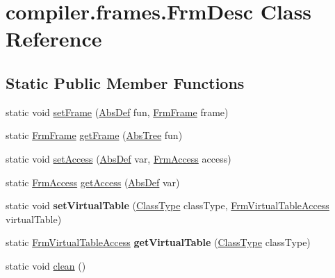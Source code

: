 \hypertarget{classcompiler_1_1frames_1_1_frm_desc}{}\section{compiler.\+frames.\+Frm\+Desc Class Reference}
\label{classcompiler_1_1frames_1_1_frm_desc}
\subsection*{Static Public Member Functions}
\begin{DoxyCompactItemize}
\item 
static void \hyperlink{classcompiler_1_1frames_1_1_frm_desc_a28716d1f65fe0570d4bd8f10bc5368e7}{set\+Frame} (\hyperlink{classcompiler_1_1abstr_1_1tree_1_1def_1_1_abs_def}{Abs\+Def} fun, \hyperlink{classcompiler_1_1frames_1_1_frm_frame}{Frm\+Frame} frame)
\item 
static \hyperlink{classcompiler_1_1frames_1_1_frm_frame}{Frm\+Frame} \hyperlink{classcompiler_1_1frames_1_1_frm_desc_a01656952662f7132eecf87da7fd7f2ec}{get\+Frame} (\hyperlink{classcompiler_1_1abstr_1_1tree_1_1_abs_tree}{Abs\+Tree} fun)
\item 
static void \hyperlink{classcompiler_1_1frames_1_1_frm_desc_a2c1d68dbff5ca39ab5ffaf4b098a2875}{set\+Access} (\hyperlink{classcompiler_1_1abstr_1_1tree_1_1def_1_1_abs_def}{Abs\+Def} var, \hyperlink{interfacecompiler_1_1frames_1_1_frm_access}{Frm\+Access} access)
\item 
static \hyperlink{interfacecompiler_1_1frames_1_1_frm_access}{Frm\+Access} \hyperlink{classcompiler_1_1frames_1_1_frm_desc_a609f7edf099f5347df87b10678edbd50}{get\+Access} (\hyperlink{classcompiler_1_1abstr_1_1tree_1_1def_1_1_abs_def}{Abs\+Def} var)
\item 
\mbox{\label{classcompiler_1_1frames_1_1_frm_desc_a31bcc6d2a72adefc77120afbd7ceead2}} 
static void {\bfseries set\+Virtual\+Table} (\hyperlink{classcompiler_1_1seman_1_1type_1_1_class_type}{Class\+Type} class\+Type, \hyperlink{classcompiler_1_1frames_1_1_frm_virtual_table_access}{Frm\+Virtual\+Table\+Access} virtual\+Table)
\item 
\mbox{\label{classcompiler_1_1frames_1_1_frm_desc_af8420dde8e6d97cbde4be96b7282c3ac}} 
static \hyperlink{classcompiler_1_1frames_1_1_frm_virtual_table_access}{Frm\+Virtual\+Table\+Access} {\bfseries get\+Virtual\+Table} (\hyperlink{classcompiler_1_1seman_1_1type_1_1_class_type}{Class\+Type} class\+Type)
\item 
static void \hyperlink{classcompiler_1_1frames_1_1_frm_desc_a59b6355f8d235a0c1d9b6293ece69850}{clean} ()
\end{DoxyCompactItemize}


